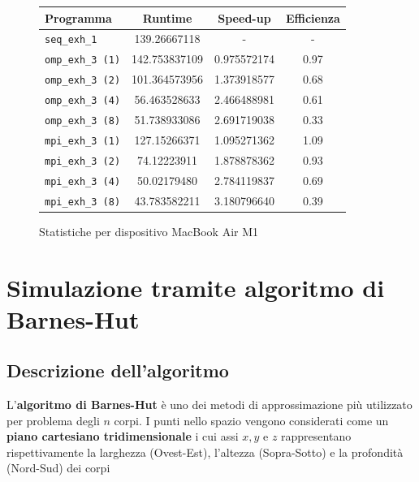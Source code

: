 \documentclass[12pt]{report}
\begin{document}
    \begin{figure}[H]
        \centering

        \begin{tabular}{ l | c | c | c }
            \textbf{Programma} & \textbf{Runtime} & \textbf{Speed-up} & \textbf{Efficienza}\\
            \hline
            \texttt{seq\_exh\_1} & 139.26667118 & - & - \\
            \hline
            \texttt{omp\_exh\_3 (1)} & 142.753837109 & 0.975572174 & 0.97 \\
            \texttt{omp\_exh\_3 (2)} & 101.364573956 & 1.373918577 & 0.68 \\
            \texttt{omp\_exh\_3 (4)} & 56.463528633 & 2.466488981 & 0.61 \\
            \texttt{omp\_exh\_3 (8)} & 51.738933086 & 2.691719038 & 0.33 \\
            \hline
            \texttt{mpi\_exh\_3 (1)} & 127.15266371 & 1.095271362 & 1.09 \\
            \texttt{mpi\_exh\_3 (2)} & 74.12223911 & 1.878878362 & 0.93 \\
            \texttt{mpi\_exh\_3 (4)} & 50.02179480 & 2.784119837 & 0.69 \\
            \texttt{mpi\_exh\_3 (8)} & 43.783582211 & 3.180796640 & 0.39 \\
        \end{tabular}
        \caption{Statistiche per dispositivo MacBook Air M1}
        \label{fig:stats_m1_1}
    \end{figure}


    \chapter{Simulazione tramite algoritmo di Barnes-Hut}

    \section{Descrizione dell'algoritmo}

    L'\textbf{algoritmo di Barnes-Hut} è uno dei metodi di approssimazione più utilizzato per problema degli $n$ corpi. I punti nello spazio vengono considerati come un \textbf{piano cartesiano tridimensionale} i cui assi $x,y$ e $z$ rappresentano rispettivamente la larghezza (Ovest-Est), l'altezza (Sopra-Sotto) e la profondità (Nord-Sud) dei corpi
        
\end{document}

